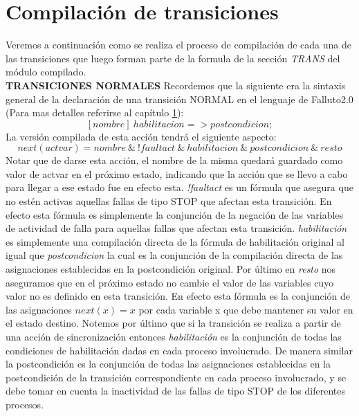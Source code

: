 \documentclass[titlepage, 12pt]{book}
\begin{document}
\section{Compilaci\'on de transiciones}
Veremos a continuaci\'on como se realiza el proceso de compilaci\'on de cada una de las transiciones que luego forman parte de la formula de la secci\'on \textit{TRANS} del m\'odulo compilado.\\

\textbf{TRANSICIONES NORMALES}
Recordemos que la siguiente era la sintaxis general de la declaraci\'on de una transici\'on NORMAL en el lenguaje de Falluto2.0 (Para mas detalles referirse al cap\'itulo \ref{}):
$$[nombre]~habilitacion => postcondicion;$$
La versi\'on compilada de esta acci\'on tendr\'a el siguiente aspecto:
$$next(actvar)=nombre~\&~!faultact~\&~habilitacion~\&~postcondicion~\&~resto$$
Notar que de darse esta acci\'on, el nombre de la misma quedar\'a guardado como valor de actvar en el pr\'oximo estado, indicando que la acci\'on que se llevo a cabo para llegar a ese estado fue en efecto esta. \textit{!faultact} es un f\'ormula que asegura que no est\'en activas aquellas fallas de tipo STOP que afectan esta transici\'on. En efecto esta f\'ormula es simplemente la conjunci\'on de la negaci\'on de las variables de actividad de falla para aquellas fallas que afectan esta transici\'on. \textit{habilitaci\'on} es simplemente una compilaci\'on directa de la f\'ormula de habilitaci\'on original al igual que \textit{postcondicion} la cual es la conjunci\'on de la compilaci\'on directa de las asignaciones establecidas en la postcondici\'on original. Por \'ultimo en \textit{resto} nos aseguramos que en el pr\'oximo estado no cambie el valor de las variables cuyo valor no es definido en esta transici\'on. En efecto esta f\'ormula es la conjunci\'on de las asignaciones $next(x)=x$ por cada variable x que debe mantener su valor en el estado destino. Notemos por \'ultimo que si la transici\'on se realiza a partir de una acci\'on de sincronizaci\'on entonces \textit{habilitaci\'on} es la conjunci\'on de todas las condiciones de habilitaci\'on dadas en cada proceso involucrado. De manera similar la postcondici\'on es la conjunci\'on de todas las asignaciones establecidas en la postcondici\'on de la transici\'on correspondiente en cada proceso involucrado, y se debe tomar en cuenta la inactividad de las fallas de tipo STOP de los diferentes procesos.\\
\end{document}

